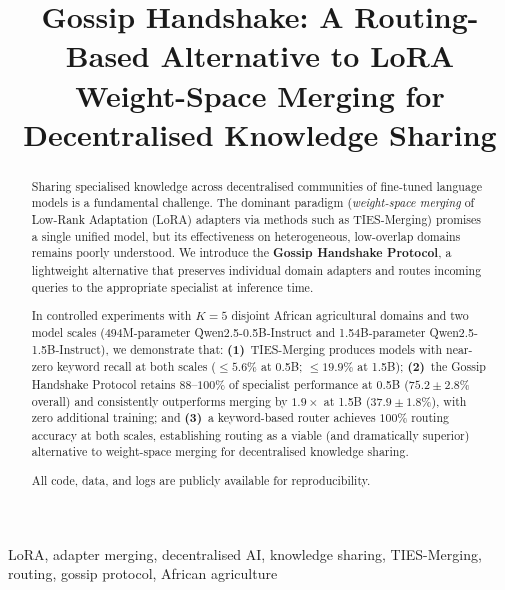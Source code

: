 \documentclass[conference, 10pt]{IEEEtran}
\begin{document}
\title{Gossip Handshake: A Routing-Based Alternative to LoRA\\
Weight-Space Merging for Decentralised Knowledge Sharing}

\author{
}

\maketitle

\begin{abstract}
Sharing specialised knowledge across decentralised communities of fine-tuned
language models is a fundamental challenge.
The dominant paradigm (\emph{weight-space merging} of Low-Rank Adaptation
(LoRA) adapters via methods such as TIES-Merging) promises a single unified
model, but its effectiveness on heterogeneous, low-overlap domains remains
poorly understood.
We introduce the \textbf{Gossip Handshake Protocol}, a lightweight
alternative that preserves individual domain adapters and routes incoming
queries to the appropriate specialist at inference time.

In controlled experiments with $K=5$ disjoint African agricultural
domains and two model scales (494M-parameter Qwen2.5-0.5B-Instruct
and 1.54B-parameter Qwen2.5-1.5B-Instruct), we demonstrate that:
\textbf{(1)}~TIES-Merging produces models with near-zero keyword recall
at both scales ($\leq 5.6\%$ at 0.5B; $\leq 19.9\%$ at 1.5B);
\textbf{(2)}~the Gossip Handshake Protocol retains $88$--$100\%$ of
specialist performance at 0.5B ($75.2 \pm 2.8\%$ overall) and
consistently outperforms merging by $1.9\times$ at 1.5B
($37.9 \pm 1.8\%$), with zero additional training; and
\textbf{(3)}~a keyword-based router achieves $100\%$ routing accuracy
at both scales, establishing routing as a viable (and dramatically
superior) alternative to weight-space merging for decentralised
knowledge sharing.

All code, data, and logs are publicly available for reproducibility.
\end{abstract}

\begin{IEEEkeywords}
LoRA, adapter merging, decentralised AI, knowledge sharing, TIES-Merging,
routing, gossip protocol, African agriculture
\end{IEEEkeywords}
\end{document}
